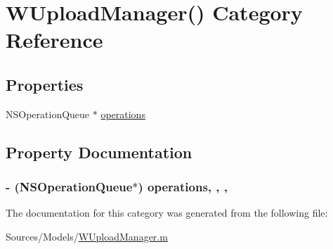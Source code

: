 \hypertarget{category_w_upload_manager_07_08}{\section{W\-Upload\-Manager() Category Reference}
\label{category_w_upload_manager_07_08}
}
\subsection*{Properties}
\begin{DoxyCompactItemize}
\item 
N\-S\-Operation\-Queue $\ast$ \hyperlink{category_w_upload_manager_07_08_a30a034f8b0ee1bcdb649f5aed8251204}{operations}
\end{DoxyCompactItemize}


\subsection{Property Documentation}
\hypertarget{category_w_upload_manager_07_08_a30a034f8b0ee1bcdb649f5aed8251204}{
\subsubsection[{operations}]{\setlength{\rightskip}{0pt plus 5cm}-\/ (N\-S\-Operation\-Queue$\ast$) operations\hspace{0.3cm}{\ttfamily [read]}, {\ttfamily [write]}, {\ttfamily [nonatomic]}, {\ttfamily [retain]}}}\label{category_w_upload_manager_07_08_a30a034f8b0ee1bcdb649f5aed8251204}


The documentation for this category was generated from the following file\-:\begin{DoxyCompactItemize}
\item 
Sources/\-Models/\hyperlink{_w_upload_manager_8m}{W\-Upload\-Manager.\-m}\end{DoxyCompactItemize}

